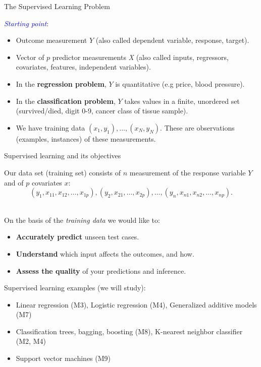 \documentclass[ignorenonframetext,]{beamer}
\providecommand{\tightlist}{%
  \setlength{\itemsep}{0pt}\setlength{\parskip}{0pt}}
\begin{document}
\begin{frame}{The Supervised Learning Problem}

\textcolor{blue}{\emph{Starting point}}:

\begin{itemize}
\item
  Outcome measurement \(Y\) (also called dependent variable, response,
  target).
\item
  Vector of \(p\) predictor measurements \emph{X} (also called inputs,
  regressors, covariates, features, independent variables).
\item
  In the \textbf{regression problem}, \(Y\) is quantitative (e.g price,
  blood pressure).
\item
  In the \textbf{classification problem}, \(Y\) takes values in a
  finite, unordered set (survived/died, digit 0-9, cancer class of
  tissue sample).
\item
  We have training data \((x_1, y_1), \ldots , (x_N , y_N )\). These are
  observations (examples, instances) of these measurements.
\end{itemize}

\end{frame}

\begin{frame}

\begin{block}{Supervised learning and its objectives}

Our data set (training set) consists of \(n\) measurement of the
response variable \(Y\) and of \(p\) covariates \(x\):
\[(y_1, x_{11}, x_{12},\ldots, x_{1p}), (y_2, x_{21},\ldots, x_{2p}), \ldots, (y_n, x_{n1}, x_{n2},\ldots, x_{np}).\]
\(~\)

On the basis of the \emph{training data} we would like to:

\begin{itemize}
\item
  \textbf{Accurately predict} unseen test cases.
\item
  \textbf{Understand} which input affects the outcomes, and how.
\item
  \textbf{Assess the quality} of your predictions and inference.
\end{itemize}

\end{block}

\end{frame}

\begin{frame}

Supervised learning examples (we will study):

\begin{itemize}
\tightlist
\item
  Linear regression (M3), Logistic regression (M4), Generalized additive
  models (M7)
\item
  Classification trees, bagging, boosting (M8), K-nearest neighbor
  classifier (M2, M4)
\item
  Support vector machines (M9)
\end{itemize}

\end{frame}
\end{document}
